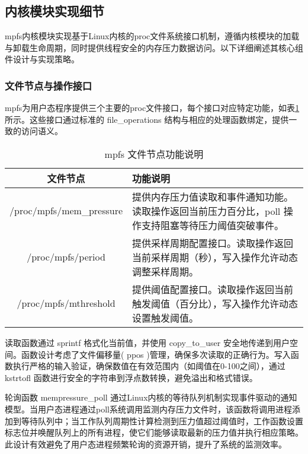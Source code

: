 \subsection{内核模块实现细节}

mpfs内核模块实现基于Linux内核的proc文件系统接口机制，遵循内核模块的加载与卸载生命周期，同时提供线程安全的内存压力数据访问。以下详细阐述其核心组件设计与实现策略。

\subsubsection{文件节点与操作接口}

mpfs为用户态程序提供三个主要的proc文件接口，每个接口对应特定功能，如表\ref{tab:mpfs_files_description}所示。这些接口通过标准的 file\_operations 结构与相应的处理函数绑定，提供一致的访问语义。

\begin{table}[htbp] %
  \centering %
  \caption{mpfs 文件节点功能说明}
  \label{tab:mpfs_files_description}
  \begin{tabularx}{\textwidth}{cX} %
      \toprule
      \textbf{文件节点} & \textbf{功能说明} \\
      \midrule
       /proc/mpfs/mem\_pressure  & 提供内存压力值读取和事件通知功能。
      读取操作返回当前压力百分比，poll 操作支持阻塞等待压力阈值突破事件。 \\
       /proc/mpfs/period  & 提供采样周期配置接口。读取操作返回当前采样周期（秒），写入操作允许动态调整采样周期。 \\
       /proc/mpfs/mthreshold  & 提供阈值配置接口。读取操作返回当前触发阈值（百分比），写入操作允许动态设置触发阈值。 \\
      \bottomrule
  \end{tabularx}
\end{table}

读取函数通过 sprintf 格式化当前值，并使用 copy\_to\_user 安全地传递到用户空间。函数设计考虑了文件偏移量( ppos )管理，确保多次读取的正确行为。写入函数执行严格的输入验证，确保数值在有效范围内（如阈值在0-100之间），通过 kstrtofl 函数进行安全的字符串到浮点数转换，避免溢出和格式错误。

轮询函数 mempressure\_poll 通过Linux内核的等待队列机制实现事件驱动的通知模型。当用户态进程通过poll系统调用监测内存压力文件时，该函数将调用进程添加到等待队列中；当工作队列周期性计算检测到压力值超过阈值时，工作函数设置标志位并唤醒队列上的所有进程，使它们能够读取最新的压力值并执行相应策略。此设计有效避免了用户态进程频繁轮询的资源开销，提升了系统的监测效率。


